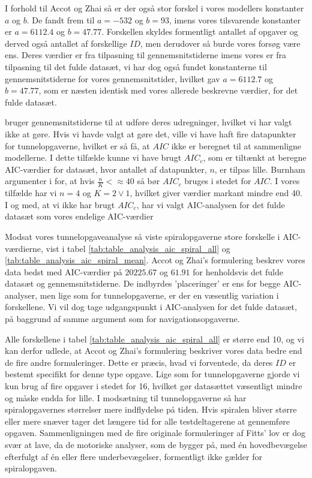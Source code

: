 I forhold til Accot og Zhai så er der også stor forskel i vores modellers konstanter $a$ og $b$. De fandt frem til $a=-532$ og $b=93$, imens vores tilsvarende konstanter er $a=6112.4$ og $b=47.77$. Forskellen skyldes formentligt antallet af opgaver og derved også antallet af forskellige $ID$, men derudover så burde vores forsøg være ens. Deres værdier er fra tilpasning til gennemsnitstiderne imens vores er fra tilpasning til det fulde datasæt, vi har dog også fundet konstanterne til gennemsnitstiderne for vores gennemsnitstider, hvilket gav $a=6112.7$ og $b=47.77$, som er næsten identisk med vores allerede beskrevne værdier, for det fulde datasæt.

\cite{accot1997} bruger gennemsnitstiderne til at udføre deres udregninger, hvilket vi har valgt ikke at gøre. Hvis vi havde valgt at gøre det, ville vi have haft fire datapunkter for tunnelopgaverne, hvilket er så få, at $AIC$ ikke er beregnet til at sammenligne modellerne. I dette tilfælde kunne vi have brugt $AIC_c$, som er tiltænkt at beregne AIC-værdier for datasæt, hvor antallet af datapunkter, $n$, er tilpas lille. Burnham argumenter i \cite{burnham2004} for, at hvis $\frac{n}{K} <\approx 40$ så bør $AIC_c$ bruges i stedet for $AIC$. I vores tilfælde har vi $n=4$ og $K=2 \vee 1$, hvilket giver værdier markant mindre end 40. I og med, at vi ikke har brugt $AIC_c$, har vi valgt AIC-analysen for det fulde datasæt som vores endelige AIC-værdier

Modsat vores tunnelopgaveanalyse så viste spiralopgaverne store forskelle i AIC-værdierne, vist i tabel \ref{tab:table_analysis_aic_spiral_all} og \ref{tab:table_analysis_aic_spiral_mean}. Accot og Zhai's formulering beskrev vores data bedst med AIC-værdier på $20225.67$ og $61.91$ for henholdsvis det fulde datasæt og gennemsnitstiderne. De indbyrdes 'placeringer' er ens for begge AIC-analyser, men lige som for tunnelopgaverne, er der en væsentlig variation i forskellene. Vi vil dog tage udgangspunkt i AIC-analysen for det fulde datasæt, på baggrund af samme argument som for navigationsopgaverne.

Alle forskellene i tabel \ref{tab:table_analysis_aic_spiral_all} er større end 10, og vi kan derfor udlede, at Accot og Zhai's formulering beskriver vores data bedre end de fire andre formuleringer. Dette er præcis, hvad vi forventede, da deres $ID$ er bestemt specifikt for denne type opgave. Lige som for tunnelopgaverne gjorde vi kun brug af fire opgaver i stedet for 16, hvilket gør datasættet væsentligt mindre og måske endda for lille. I modsætning til tunnelopgaverne så har spiralopgavernes størrelser mere indflydelse på tiden. Hvis spiralen bliver større eller mere snæver tager det længere tid for alle testdeltagerene at gennemføre opgaven. Sammenligningen med de fire originale formuleringer af Fitts' lov er dog svær at lave, da de motoriske analyser, som de bygger på, med én hovedbevægelse efterfulgt af én eller flere underbevægelser, formentligt ikke gælder for spiralopgaven.

